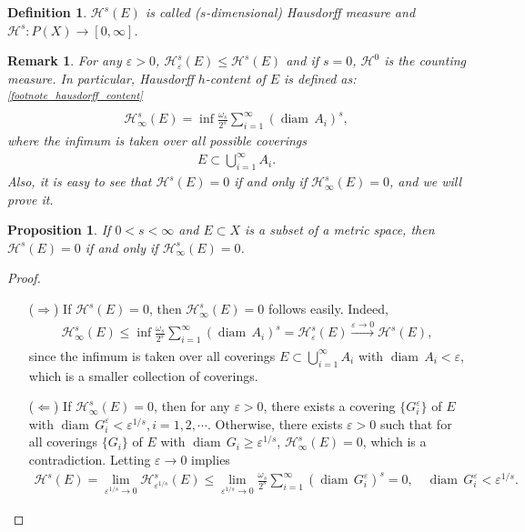 \documentclass[11pt]{book}
\newtheorem{definition}{Definition}[chapter]
\newtheorem{proposition}{Proposition}[chapter]
\newtheorem{remark}{Remark}[chapter]
\theoremstyle{definition}
\numberwithin{equation}{chapter}
\def\H{{\mathcal H}}
\def\diam{{\operatorname{diam}\,}}
\begin{document}
\begin{definition}
$\mathcal{H}^s(E)$ is called ($s$-dimensional) Hausdorff measure and $\mathcal{H}^s: P(X) \to [0,\infty]$.
\end{definition}

\medskip

\begin{remark}
For any $\varepsilon > 0$, $\mathcal{H}^s_{\varepsilon}(E) \leq \mathcal{H}^s(E)$ and if $s = 0$, $\mathcal{H}^0$ is the counting measure. In particular, Hausdorff $h$-content of $E$ is defined as:\textsuperscript{{\rm \ref{footnote_hausdorff_content}}}
\begin{align*}
    \mathcal{H}^s_{\infty}(E) = \inf \frac{\omega_s}{2^s} \sum^\infty_{i=1} \left(\diam A_i\right)^s,
\end{align*}
where the infimum is taken over all possible coverings
\begin{align*}
    E \subset \bigcup^\infty_{i=1} A_i.
\end{align*}
Also, it is easy to see that $\mathcal{H}^s(E) = 0$ if and only if $\mathcal{H}_\infty^s(E) = 0$, and we will prove it.
\end{remark}

\medskip

\begin{proposition}
If $0 < s < \infty$ and $E \subset X$ is a subset of a metric space, then $\mathcal{H}^s(E) = 0$ if and only if $\mathcal{H}_\infty^s(E) = 0$.
\end{proposition}
\begin{proof}\cite{11}
~\begin{enumerate}
    \item[($\Rightarrow$)] If $\H^s(E) = 0$, then  $\H^s_\infty(E) = 0$ follows easily. Indeed, \begin{align*}
        \H^s_\infty(E) \leq \inf \frac{\omega_s}{2^s} \sum_{i=1}^\infty (\diam A_i)^s = \H^s_\varepsilon(E) \xrightarrow[]{\varepsilon \to 0} \H^s(E),
    \end{align*}  
    since the infimum is taken over all coverings $E \subset \bigcup^\infty_{i=1} A_i$ with $\diam A_i < \varepsilon$, which is a smaller collection of coverings.
    
    \item[($\Leftarrow$)] If $\H^s_\infty(E) = 0$, then for any $\varepsilon > 0$, there exists a covering $\{G^\varepsilon_i\}$ of $E$ with $\diam G^\varepsilon_i < \varepsilon^{1/s}, i = 1,2,\cdots$. Otherwise, there exists $\varepsilon > 0$ such that for all coverings $\{G_i\}$ of $E$ with $\diam G_i \geq \varepsilon^{1/s}$, $\H^s_\infty(E) = 0$, which is a contradiction. Letting $\varepsilon \to 0$ implies
    \begin{align*}
        \H^s(E) = \lim_{\varepsilon^{1/s} \to 0}\H^s_{\varepsilon^{1/s}}(E) \leq \lim_{\varepsilon^{1/s} \to 0} \frac{\omega_s}{2^s} \sum^\infty_{i=1} (\diam G^\varepsilon_i)^s = 0, \quad \diam G^\varepsilon_i < \varepsilon^{1/s}.
    \end{align*}
\end{enumerate}
\end{proof}
\end{document}
